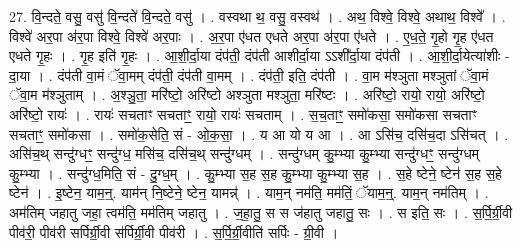 \documentclass[17pt]{extarticle}
\begin{document}
27. वि॒न्दते॒ वसु॒ वसु॑ वि॒न्दते॑ वि॒न्दते॒ वसु॑ । . वस्वथा थ॒ वसु॒ वस्वथ॑ । . अथ॒ विश्वे॒ विश्वे॒ अथाथ॒ विश्वे᳚ । . विश्वे॑ अर॒पा अ॑र॒पा विश्वे॒ विश्वे॑ अर॒पाः । . अ॒र॒पा ए॑धत एधते अर॒पा अ॑र॒पा ए॑धते । . ए॒ध॒ते॒ गृ॒हो गृ॒ह ए॑धत एधते गृ॒हः । . गृ॒ह इति॑ गृ॒हः । . आ॒शी॒र्दा॒या दंप॑ती॒ दंप॑ती आशीर्दा॒या ऽऽशी᳚र्दा॒या दंप॑ती । . आ॒शी॒र्दा॒येत्या॑शीः - दा॒या । . दंप॑ती वा॒मं ॅवा॒मम् दंप॑ती॒ दंप॑ती वा॒मम् । . दंप॑ती॒ इति॒ दंप॑ती । . वा॒म म॑श्ञुता मश्ञुतां ॅवा॒मं ॅवा॒म म॑श्ञुताम् । . अ॒श्ञु॒ता॒ मरि॑ष्टो॒ अरि॑ष्टो अश्ञुता मश्ञुता॒ मरि॑ष्टः । . अरि॑ष्टो॒ रायो॒ रायो॒ अरि॑ष्टो॒ अरि॑ष्टो॒ रायः॑ । . रायः॑ सचताꣳ सचताꣳ॒॒ रायो॒ रायः॑ सचताम् । . स॒च॒ताꣳ॒॒ समो॑कसा॒ समो॑कसा सचताꣳ सचताꣳ॒॒ समो॑कसा । . समो॑क॒सेति॒ सं - ओ॒क॒सा॒ । . य आ यो य आ । . आ ऽसि॑च॒ दसि॑च॒दा ऽसि॑चत् । . असि॑च॒थ् सन्दु॑ग्धꣳ॒॒ सन्दु॑ग्ध॒ मसि॑च॒ दसि॑च॒थ् सन्दु॑ग्धम् । . सन्दु॑ग्धम् कु॒म्भ्या कु॒म्भ्या सन्दु॑ग्धꣳ॒॒ सन्दु॑ग्धम् कु॒म्भ्या । . सन्दु॑ग्ध॒मिति॒ सं - दु॒ग्ध॒म् । . कु॒म्भ्या स॒ह स॒ह कु॒म्भ्या कु॒म्भ्या स॒ह । . स॒हे ष्टेने॒ ष्टेन॑ स॒ह स॒हे ष्टेन॑ । . इ॒ष्टेन॒ याम॒न्॒. याम॑न् नि॒ष्टेने॒ ष्टेन॒ यामन्न्॑ । . याम॒न् नम॑ति॒ मम॑तिं॒ ॅयाम॒न्॒. याम॒न् नम॑तिम् । . अम॑तिम् जहातु जहा॒ त्वम॑ति॒ मम॑तिम् जहातु । . ज॒हा॒तु॒ स स ज॑हातु जहातु॒ सः । . स इति॒ सः । . स॒र्पि॒र्ग्री॒वी पीव॑री॒ पीव॑री सर्पिर्ग्री॒वी स॑र्पिर्ग्री॒वी पीव॑री । . स॒र्पि॒र्ग्री॒वीति॑ सर्पिः - ग्री॒वी । \newline
\end{document}
